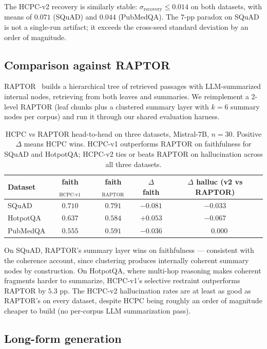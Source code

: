 The HCPC-v2 recovery is similarly stable: $\sigma_{\textrm{recovery}}
\le 0.014$ on both datasets, with means of $0.071$ (SQuAD) and $0.044$
(PubMedQA). The 7-pp paradox on SQuAD is not a single-run artifact; it
exceeds the cross-seed standard deviation by an order of magnitude.

\subsection{Comparison against RAPTOR}
\label{sec:rob:raptor}

RAPTOR~\citep{raptor2024} builds a hierarchical tree of retrieved
passages with LLM-summarized internal nodes, retrieving from both leaves
and summaries. We reimplement a 2-level RAPTOR (leaf chunks plus a
clustered summary layer with $k=6$ summary nodes per corpus) and run it
through our shared evaluation harness.

\begin{table}[!htb]
\centering
\caption{HCPC vs RAPTOR head-to-head on three datasets, Mistral-7B,
$n=30$. Positive $\Delta$ means HCPC wins. HCPC-v1 outperforms RAPTOR on
faithfulness for SQuAD and HotpotQA; HCPC-v2 ties or beats RAPTOR on
hallucination across all three datasets.}
\label{tab:raptor}
\footnotesize
\begin{tabular}{lcccc}
\toprule
Dataset   & faith$_{\textrm{HCPC-v1}}$ & faith$_{\textrm{RAPTOR}}$ & $\Delta$ faith & $\Delta$ halluc (v2 vs RAPTOR) \\
\midrule
SQuAD     & $0.710$ & $0.791$ & \emph{$-0.081$} & $-0.033$ \\
HotpotQA  & $0.637$ & $0.584$ & $\mathbf{+0.053}$ & $-0.067$ \\
PubMedQA  & $0.555$ & $0.591$ & $-0.036$ & $\phantom{+}0.000$ \\
\bottomrule
\end{tabular}
\end{table}

On SQuAD, RAPTOR's summary layer wins on faithfulness — consistent with
the coherence account, since clustering produces internally coherent
summary nodes by construction. On HotpotQA, where multi-hop reasoning
makes coherent fragments harder to summarize, HCPC-v1's selective
restraint outperforms RAPTOR by $5.3$ pp. The HCPC-v2 hallucination
rates are at least as good as RAPTOR's on every dataset, despite HCPC
being roughly an order of magnitude cheaper to build (no per-corpus LLM
summarization pass).

\subsection{Long-form generation}
\label{sec:rob:longform}

